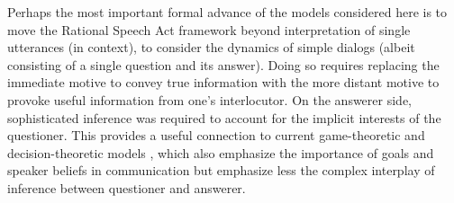\documentclass[12pt, floatsintext, jou]{apa6}
\begin{document}



Perhaps the most important formal advance of the models considered here is to move the Rational Speech Act framework beyond interpretation of single utterances (in context), to consider the dynamics of simple dialogs (albeit consisting of a single question and its answer). 
Doing so requires replacing the immediate motive to convey true information with the more distant motive to provoke useful information from one's interlocutor. On the answerer side, sophisticated inference was required to account for the implicit interests of the questioner. This provides a useful connection to current game-theoretic and decision-theoretic models \cite{VogelBodoiaPottsJurafsky13_GricePOMDP, VanRooy03_QuestioningDecisionProblems}, which also emphasize the importance of goals and speaker beliefs in communication but emphasize less the complex interplay of inference between questioner and answerer.


\end{document}
